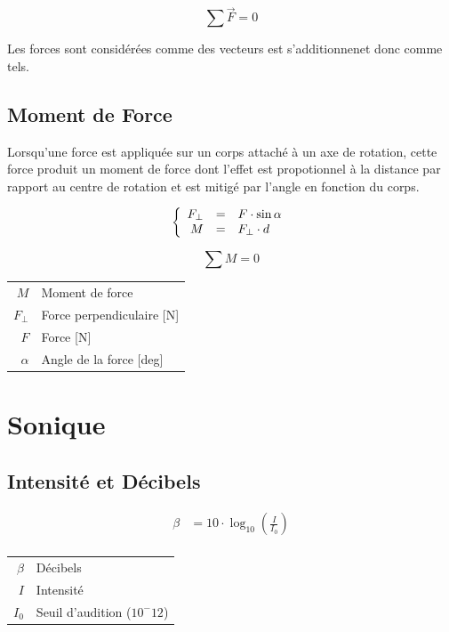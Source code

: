 \documentclass[12pt,a4paper]{article} %
\begin{document}
	$$\sum \vec{F} = 0$$

Les forces sont considérées comme des vecteurs est s'additionnenet donc comme tels.

\subsection{Moment de Force}
Lorsqu'une force est appliquée sur un corps attaché à un axe de rotation, cette force produit un moment de force dont l'effet est propotionnel à la distance par rapport au centre de rotation et est mitigé par l'angle en fonction du corps.
\par\hspace{1em}
\begin{mdframed}[leftmargin=2em, rightmargin=2em]
	\begin{twocols}[0.5][0.5]
	$$
		\left\{
			\begin{array}{rcl}
			F_\perp & = & F \cdot \sin \alpha \\
			M & = & F_\perp \cdot d \\
			\end{array}
		\right.
	$$

	$$
		\sum M = 0
	$$
	\nextcol
	\begin{tabular}{rl}
		$M$ & Moment de force \\
		$F_\perp$ & Force perpendiculaire [N] \\
		$F$ & Force [N] \\
		$\alpha$ & Angle de la force [deg] \\
	\end{tabular}
	\end{twocols}
\end{mdframed}

\newpage

\section{Sonique}

\subsection{Intensité et Décibels}
\begin{twocols}
	\begin{align*}
		\beta &= 10 \cdot \log_{10}\left(\frac{I}{I_0}\right) \\
	\end{align*}
\nextcol
	\begin{tabular}{rl}
		$\beta$ & Décibels \\
		$I$ & Intensité \\
		$I_0$ & Seuil d'audition ($10^-12$) \\
	\end{tabular}
\end{twocols}
\end{document}
